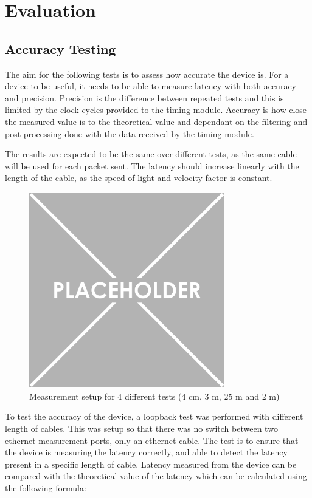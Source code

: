 \chapter{Evaluation}\label{C:eval}

\section{Accuracy Testing}

The aim for the following tests is to assess how accurate the device is. For a device to be useful, it needs to be 
able to measure latency with both accuracy and precision. Precision is the difference between repeated tests and 
this is limited by the clock cycles provided to the timing module. Accuracy is how close the measured value is to 
the theoretical value and dependant on the filtering and post processing done with the data received by the timing 
module. 

The results are expected to be the same over different tests, as the same cable will be used for each packet sent. 
The latency should increase linearly with the length of the cable, as the speed of light and velocity factor is 
constant.

\begin{figure}[H]
    \begin{center}
        \includegraphics[keepaspectratio,height=8.5cm]{Images/TestSetup}
        \caption{Measurement setup for 4 different tests (4 cm, 3 m, 25 m and 2 m)}
        \label{fig:testSetup}
    \end{center}
\end{figure}

To test the accuracy of the device, a loopback test was performed with different length of cables. This was setup so 
that there was no switch between two ethernet measurement ports, only an ethernet cable. The test is to ensure that 
the device is measuring the latency correctly, and able to detect the latency present in a specific length of cable. 
Latency measured from the device can be compared with the theoretical value of the latency which can be calculated 
using the following formula:

